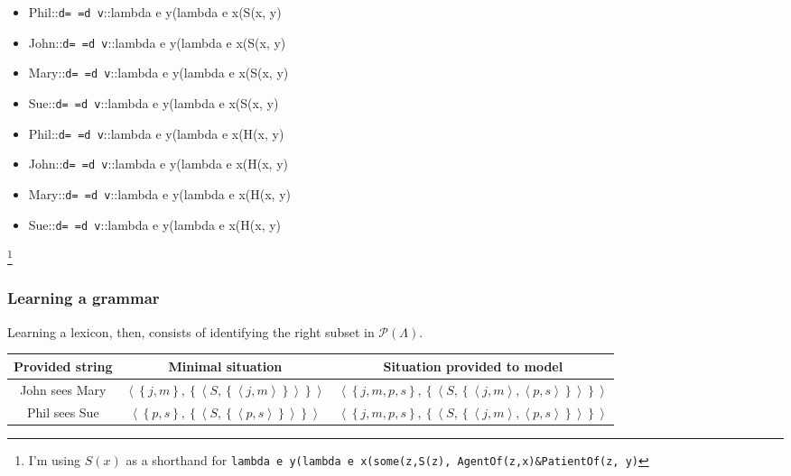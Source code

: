 \documentclass[aspectratio=169]{beamer}
\newcommand{\lex}[3]{{#1}::{\texttt{#2}}::{#3}}
\begin{document}
\begin{frame}
\begin{tiny}
\begin{multicols}{3}
\begin{itemize}
  \item \lex{Phil}{d=~=d~v}{lambda e y(lambda e x(S(x, y)}
  \item \lex{John}{d=~=d~v}{lambda e y(lambda e x(S(x, y)}
  \item \lex{Mary}{d=~=d~v}{lambda e y(lambda e x(S(x, y)}
  \item \lex{Sue}{d=~=d~v}{lambda e y(lambda e x(S(x, y)}
  \item \lex{Phil}{d=~=d~v}{lambda e y(lambda e x(H(x, y)}
  \item \lex{John}{d=~=d~v}{lambda e y(lambda e x(H(x, y)}
  \item \lex{Mary}{d=~=d~v}{lambda e y(lambda e x(H(x, y)}
  \item \lex{Sue}{d=~=d~v}{lambda e y(lambda e x(H(x, y)}
\end{itemize}
\end{multicols}
\end{tiny}\footnote{I'm using $S(x)$ as a shorthand for  \tiny\lstinline{lambda e y(lambda e x(some(z,S(z), AgentOf(z,x)&PatientOf(z, y)}}


\end{frame}
%
%
%
\begin{frame}
\frametitle{Learning a grammar}
Learning a lexicon, then, consists of identifying the right subset in $\mathcal{P}(\Lambda)$.
\vspace{1em}
\begin{tabular}{ccc}
  \toprule
  Provided string & Minimal situation & Situation provided to model\\ 
  \midrule
  John sees Mary & $\left\langle\left\{j, m\right\}, \left\{\left\langle S, \left\{\left\langle j, m \right\rangle\right\}\right\rangle\right\}\right\rangle$ &
  $\left\langle\left\{j, m, p, s\right\}, \left\{\left\langle S, \left\{\left\langle j, m \right\rangle, \left\langle p, s \right\rangle\right\}\right\rangle\right\}\right\rangle$
  \\
  Phil sees Sue & $\left\langle\left\{p, s\right\}, \left\{\left\langle S, \left\{\left\langle p, s \right\rangle\right\}\right\rangle\right\}\right\rangle$ &
  $\left\langle\left\{j, m, p, s\right\}, \left\{\left\langle S, \left\{\left\langle j, m \right\rangle, \left\langle p, s \right\rangle\right\}\right\rangle\right\}\right\rangle$
  \\
  \bottomrule
\end{tabular}
\end{frame}
\end{document}
